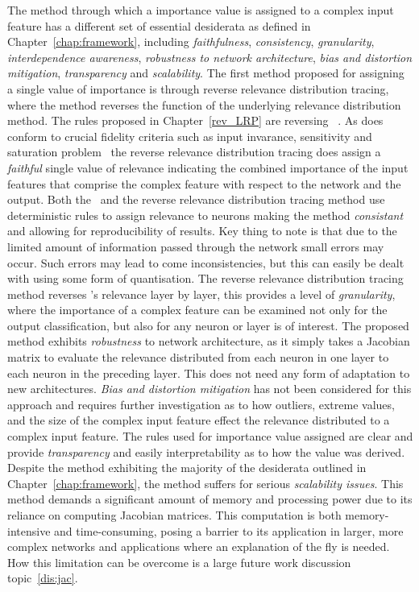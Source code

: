 \begin{Desideratum}
The method through which a importance value is assigned to a complex input feature has a different set of essential desiderata as defined in Chapter~\ref{chap:framework}, including \emph{faithfulness}, \emph{consistency}, \emph{granularity}, \emph{interdependence awareness}, \emph{robustness to network architecture}, \emph{bias and distortion mitigation}, \emph{transparency} and \emph{scalability}. The first method proposed for assigning a single value of importance is through reverse relevance distribution tracing, where the method reverses the function of the underlying relevance distribution method. The rules proposed in Chapter~\ref{rev_LRP} are reversing \LRP~\cite{bach2015pixel}. As \LRP does conform to crucial fidelity criteria such as input invarance, sensitivity and saturation problem~\cite{} the reverse relevance distribution tracing does assign a \emph{faithful} single value of relevance indicating the combined importance of the input features that comprise the complex feature with respect to the network and the output. Both the \LRP\ and the  reverse relevance distribution tracing method use deterministic rules to assign relevance to neurons making the method \emph{consistant} and allowing for reproducibility of results. Key thing to note is that due to the limited amount of information passed through the network small errors may occur. Such errors may lead to come inconsistencies, but this can easily be dealt with using some form of quantisation. The reverse relevance distribution tracing method reverses \LRP's relevance layer by layer, this provides a level of \emph{granularity}, where the importance of a complex feature can be examined not only for the output classification, but also for any neuron or layer is of interest. The proposed method exhibits \emph{robustness} to network architecture, as it simply takes a Jacobian matrix to evaluate the relevance distributed from each neuron in one layer to each neuron in the preceding layer. This does not need any form of adaptation to new architectures. \emph{Bias and distortion mitigation} has not been considered for this approach and requires further investigation as to how outliers, extreme values, and the size of the complex input feature effect the relevance distributed to a complex input feature. The rules used for importance value assigned are clear and provide \emph{transparency} and easily interpretability as to how the value was derived. Despite the method exhibiting the majority of the desiderata outlined in Chapter~\ref{chap:framework}, the method suffers for serious \emph{scalability issues}. This method demands a significant amount of memory and processing power due to its reliance on computing Jacobian matrices. This computation is both memory-intensive and time-consuming, posing a barrier to its application in larger, more complex networks and applications where an explanation of the fly is needed. How this limitation can be overcome is a large future work discussion topic~\ref{dis:jac}.



\end{Desideratum}
